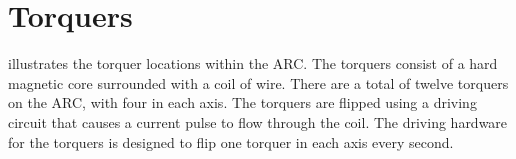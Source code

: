 
\section{Torquers}

 illustrates the torquer locations within the \ac{ARC}. The torquers consist of a hard magnetic core surrounded with a coil of wire. There are a total of twelve torquers on the \ac{ARC}, with four in each axis. The torquers are flipped using a driving circuit that causes a current pulse to flow through the coil. The driving hardware for the torquers is designed to flip one torquer in each axis every second.

